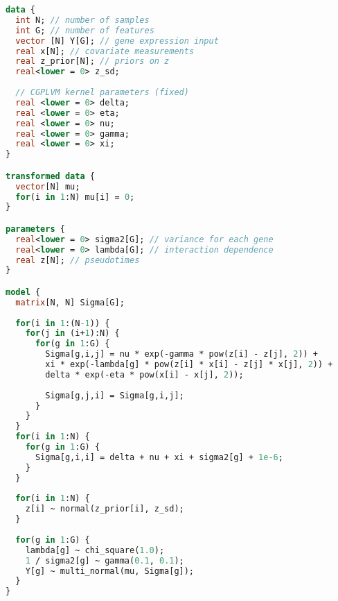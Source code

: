 \begin{lstlisting}[language=Stan]
data {
  int N; // number of samples
  int G; // number of features
  vector [N] Y[G]; // gene expression input
  real x[N]; // covariate measurements
  real z_prior[N]; // priors on z
  real<lower = 0> z_sd;
  
  // CGPLVM kernel parameters (fixed)
  real <lower = 0> delta;
  real <lower = 0> eta;
  real <lower = 0> nu;
  real <lower = 0> gamma;
  real <lower = 0> xi;
}

transformed data {
  vector[N] mu;
  for(i in 1:N) mu[i] = 0;
}

parameters {
  real<lower = 0> sigma2[G]; // variance for each gene
  real<lower = 0> lambda[G]; // interaction dependence
  real z[N]; // pseudotimes
}

model {
  matrix[N, N] Sigma[G];
  
  for(i in 1:(N-1)) {
    for(j in (i+1):N) {
      for(g in 1:G) {
        Sigma[g,i,j] = nu * exp(-gamma * pow(z[i] - z[j], 2)) + 
        xi * exp(-lambda[g] * pow(z[i] * x[i] - z[j] * x[j], 2)) +
        delta * exp(-eta * pow(x[i] - x[j], 2));
        
        Sigma[g,j,i] = Sigma[g,i,j];
      }
    }
  }
  for(i in 1:N) {
    for(g in 1:G) {
      Sigma[g,i,i] = delta + nu + xi + sigma2[g] + 1e-6;
    }
  }
  
  for(i in 1:N) {
    z[i] ~ normal(z_prior[i], z_sd);
  }
  
  for(g in 1:G) {
    lambda[g] ~ chi_square(1.0);
    1 / sigma2[g] ~ gamma(0.1, 0.1);
    Y[g] ~ multi_normal(mu, Sigma[g]);
  }
}
\end{lstlisting}
